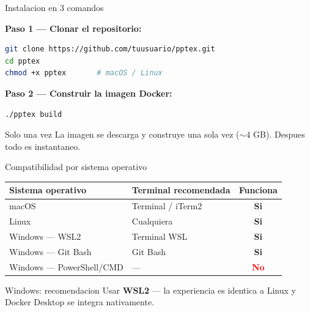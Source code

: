 \begin{frame}[fragile]{Instalacion en 3 comandos}

  \textbf{Paso 1 — Clonar el repositorio:}
  \begin{lstlisting}[language=bash]
git clone https://github.com/tuusuario/pptex.git
cd pptex
chmod +x pptex       # macOS / Linux
  \end{lstlisting}

  \textbf{Paso 2 — Construir la imagen Docker:}
  \begin{lstlisting}[language=bash]
./pptex build
  \end{lstlisting}

  \begin{exampleblock}{Solo una vez}
    La imagen se descarga y construye una sola vez (\(\sim\)4 GB).
    Despues todo es instantaneo.
  \end{exampleblock}
\end{frame}

\begin{frame}{Compatibilidad por sistema operativo}
  \begin{table}
    \centering
    \begin{tabular}{llc}
      \toprule
      Sistema operativo        & Terminal recomendada & Funciona \\
      \midrule
      macOS                    & Terminal / iTerm2    & \textcolor{green!60!black}{\textbf{Si}} \\
      Linux                    & Cualquiera           & \textcolor{green!60!black}{\textbf{Si}} \\
      Windows — WSL2           & Terminal WSL         & \textcolor{green!60!black}{\textbf{Si}} \\
      Windows — Git Bash       & Git Bash             & \textcolor{green!60!black}{\textbf{Si}} \\
      Windows — PowerShell/CMD & —                    & \textcolor{red}{\textbf{No}} \\
      \bottomrule
    \end{tabular}
  \end{table}

  \vspace{0.5em}
  \begin{block}{Windows: recomendacion}
    Usar \textbf{WSL2} — la experiencia es identica a Linux y Docker
    Desktop se integra nativamente.
  \end{block}
\end{frame}
